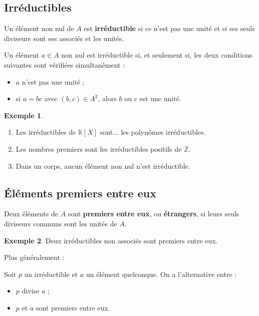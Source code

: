 \documentclass[french]{article}
\newcommand{\Z}{\mathbb{Z}}
\newcommand{\K}{\mathbb{K}}
\theoremstyle{plain}
\theoremstyle{definition}
\newtheorem*{ex}{Exemple}
\theoremstyle{remark}
\begin{document}
\subsection{Irréductibles}

\begin{dfn}
	Un élément non nul de $A$ est \textbf{irréductible} si ce n'est pas une unité et si ses seuls diviseurs sont ses associés et les unités.
\end{dfn}

\begin{prop}%
	Un élément $a\in A$ non nul est irréductible si, et seulement si, les deux conditions suivantes sont vérifiées simultanément :
	\begin{itemize}
		\item $a$ n'est pas une unité ;
		\item si $a=bc$ avec $(b,c)\in A^2$, alors $b$ ou $c$ est une unité.
	\end{itemize}
\end{prop}

\begin{ex}
	\begin{enumerate}
		\item Les irréductibles de $\K[X]$ sont... les polynômes irréductibles.
		\item Les nombres premiers sont les irréductibles positifs de $\Z$.
		\item Dans un corps, aucun élément non nul n'est irréductible.
	\end{enumerate}
\end{ex}

\subsection{Éléments premiers entre eux}

\begin{dfn}
	Deux éléments de $A$ sont \textbf{premiers entre eux}, ou \textbf{étrangers}, si leurs seuls diviseurs communs sont les unités de $A$.
\end{dfn}

\begin{ex}
	Deux irréductibles non associés sont premiers entre eux.
\end{ex}

Plus généralement :

\begin{prop}%
	Soit $p$ un irréductible et $a$ un élément quelconque. On a l'alternative entre :
	\begin{itemize}
		\item $p$ divise $a$ ;
		\item $p$ et $a$ sont premiers entre eux.
	\end{itemize}
\end{prop}
\end{document}
